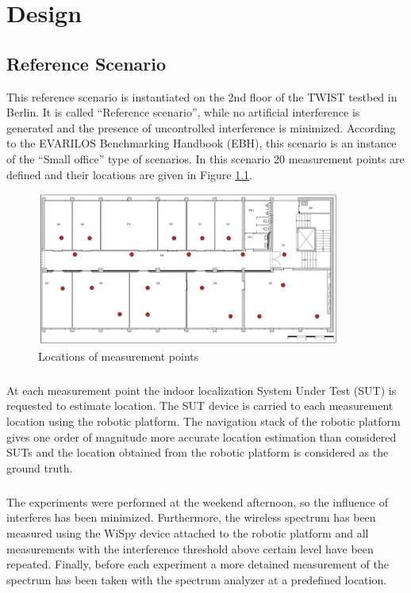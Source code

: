 \documentclass[11pt,a4paper,headinclude,footinclude,chapterprefix=on]{scrreprt}
\begin{document}
\chapter{Design} 
\section{Reference Scenario} 
This reference scenario is instantiated on the 2nd floor of the TWIST testbed in Berlin. It is called “Reference scenario”, while no artificial interference is generated and the presence of uncontrolled interference is minimized. According to the EVARILOS Benchmarking Handbook (EBH), this scenario is an instance of the “Small office” type of scenarios. In this scenario 20 measurement points are defined and their locations are given in Figure \ref{fig:floor}.

\begin{figure}
	[!h] \centering 
	\includegraphics[width=100mm]{Images/floor} \caption{Locations of measurement points} \label{fig:floor} 
\end{figure}

\paragraph{} At each measurement point the indoor localization System Under Test (SUT) is requested to estimate location. The SUT device is carried to each measurement location using the robotic platform. The navigation stack of the robotic platform gives one order of magnitude more accurate location estimation than considered SUTs and the location obtained from the robotic platform is considered as the ground truth.

\paragraph{} The experiments were performed at the weekend afternoon, so the influence of interferes has been minimized. Furthermore, the wireless spectrum has been measured using the WiSpy device attached to the robotic platform and all measurements with the interference threshold above certain level have been repeated. Finally, before each experiment a more detained measurement of the spectrum has been taken with the spectrum analyzer at a predefined location.
\end{document}

